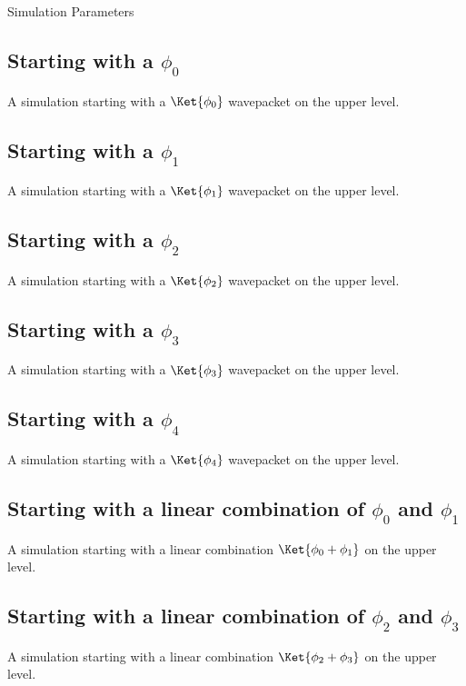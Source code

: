 \begin{chapter}{Simulation Parameters}
\subsection{Starting with a $\phi_0$}
\label{cfg:delta_gap_phi0}
A simulation starting with a $\Ket{\phi_0}$ wavepacket on the upper level.

\subsection{Starting with a $\phi_1$}
\label{cfg:delta_gap_phi1}
A simulation starting with a $\Ket{\phi_1}$ wavepacket on the upper level.

\subsection{Starting with a $\phi_2$}
\label{cfg:delta_gap_phi2}
A simulation starting with a $\Ket{\phi_2}$ wavepacket on the upper level.

\subsection{Starting with a $\phi_3$}
\label{cfg:delta_gap_phi3}
A simulation starting with a $\Ket{\phi_3}$ wavepacket on the upper level.

\subsection{Starting with a $\phi_4$}
\label{cfg:delta_gap_phi4}
A simulation starting with a $\Ket{\phi_4}$ wavepacket on the upper level.


\subsection{Starting with a linear combination of $\phi_0$ and $\phi_1$}
\label{cfg:delta_gap_phi0phi1}
A simulation starting with a linear combination $\Ket{\phi_0+\phi_1}$ on the upper level.

\subsection{Starting with a linear combination of $\phi_2$ and $\phi_3$}
\label{cfg:delta_gap_phi2phi3}
A simulation starting with a linear combination $\Ket{\phi_2+\phi_3}$ on the upper level.



\end{chapter}
